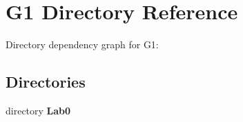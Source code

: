 \section{G1 Directory Reference}
\label{dir_7986f3cfd0ac26157d1cc2865660f726}
Directory dependency graph for G1\+:
\subsection*{Directories}
\begin{DoxyCompactItemize}
\item 
directory {\bf Lab0}
\end{DoxyCompactItemize}

